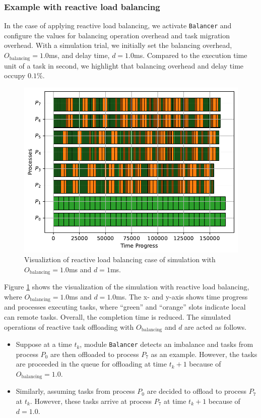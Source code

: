 \subsubsection{Example with reactive load balancing}
\label{subsubsec:eval-sim-example-reactlb}

In the case of applying reactive load balancing, we activate \texttt{Balancer} and configure the values for balancing operation overhead and task migration overhead. With a simulation trial, we initially set the balancing overhead, $O_{\text{balancing}} = 1.0$ms, and delay time, $d=1.0$ms. Compared to the execution time unit of a task in second, we highlight that balancing overhead and delay time occupy $0.1\%$.\\

\begin{figure}[t]
  \centering
  \includegraphics[scale=0.65]{./pictures/poc_implementation/poc_visualize_reactlb_O1_d1_8_processes.pdf}
	\caption{Visualiztion of reactive load balancing case of simulation with $O_{\text{balancing}} = 1.0$ms and $d=1$ms.}
	\label{fig:simulator_reactlb_O1_d1_case}
\end{figure}

Figure \ref{fig:simulator_reactlb_O1_d1_case} shows the visualization of the simulation with reactive load balancing, where $O_{\text{balancing}} = 1.0$ms and $d = 1.0$ms. The x- and y-axis shows time progress and processes executing tasks, where ``green'' and ``orange'' slots indicate local can remote tasks. Overall, the completion time is reduced. The simulated operations of reactive task offloading with $O_{\text{balancing}}$ and $d$ are acted as follows.
\begin{itemize}
	\item Suppose at a time $t_{k}$, module \texttt{Balancer} detects an imbalance and tasks from process $P_{0}$ are then offloaded to process $P_{7}$ as an example. However, the tasks are proceeded in the queue for offloading at time $t_{k} + 1$ because of $O_{\text{balancing}} = 1.0$.
	\item Similarly, assuming tasks from process $P_{0}$ are decided to offload to process $P_{7}$ at $t_{k}$. However, these tasks arrive at process $P_{7}$ at time $t_{k} + 1$ because of $d = 1.0$.
\end{itemize}

